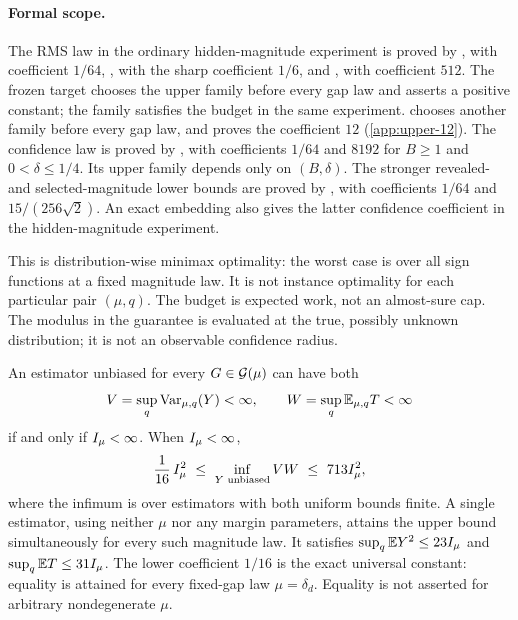 \paragraph{Formal scope.}
The RMS law in the ordinary hidden-magnitude experiment is proved by
, with coefficient
$1/64$, , with the sharp
coefficient $1/6$, and
, with
coefficient $512$. The frozen target
 chooses the
upper family before every gap law and asserts a positive constant; the
family satisfies the budget in the same experiment.
 chooses another
family before every gap law, and
 proves the
coefficient $12$ (\cref{app:upper-12}). The
confidence law is proved by ,
with coefficients $1/64$ and $8192$ for $B\ge1$ and $0<\delta\le1/4$.
Its upper family depends only on $(B,\delta)$. The stronger revealed- and
selected-magnitude lower bounds are proved by
, with coefficients
$1/64$ and $15/(256\sqrt2)$. An exact embedding also gives the latter
confidence coefficient in the hidden-magnitude experiment.

This is distribution-wise minimax optimality: the worst case is over all
sign functions at a fixed magnitude law. It is not instance optimality
for each particular pair $(\mu,q)$. The budget is expected work, not an
almost-sure cap. The modulus in the guarantee is evaluated at the true,
possibly unknown distribution; it is not an observable confidence radius.

\begin{theorem}
\label{thm:unbiased}
An estimator unbiased for every $G\in\mathcal G(\mu)$ can have both
\[
 V=\sup_q\operatorname{Var}_{\mu,q}(Y)<\infty,\qquad
 W=\sup_q\mathbb E_{\mu,q}T<\infty
\]
if and only if $I_\mu<\infty$. When $I_\mu<\infty$,
\begin{equation}\label{eq:product}
 \frac1{16}\,I_\mu^2
 \ \le\ \inf_{Y\text{ unbiased}} VW
 \ \le\ 713I_\mu^2,
\end{equation}
where the infimum is over estimators with both uniform bounds finite.
A single estimator, using neither $\mu$ nor any margin parameters, attains
the upper bound simultaneously for every such magnitude law. It satisfies
$\sup_q\mathbb E Y^2\le23I_\mu$ and $\sup_q\mathbb E T\le31I_\mu$.
The lower coefficient $1/16$ is the exact universal constant: equality is
attained for every fixed-gap law $\mu=\delta_d$. Equality is not asserted
for arbitrary nondegenerate $\mu$.
\end{theorem}

